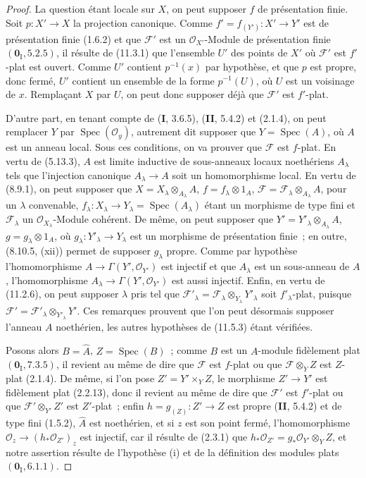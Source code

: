 \begin{proof}
La question étant locale sur $X$, on peut supposer $f$ de présentation finie.
Soit $p:X'\to X$ la projection canonique. Comme
$f'=f_{(Y')}:X'\to Y'$ est de présentation finie (1.6.2) et que $\mathcal F'$
est un $\mathcal O_{X'}$-Module de présentation finie
$(\mathbf 0_{\mathrm I},5.2.5)$, il résulte de (11.3.1) que l'ensemble $U'$ des
points de $X'$ où $\mathcal F'$ est $f'$-plat est ouvert. Comme $U'$ contient
$p^{-1}(x)$ par hypothèse, et que $p$ est propre, donc fermé, $U'$ contient un
ensemble de la forme $p^{-1}(U)$, où $U$ est un voisinage de $x$. Remplaçant $X$
par $U$, on peut donc supposer déjà que $\mathcal F'$ est $f'$-plat.

D'autre part, en tenant compte de (\textbf I, 3.6.5), (\textbf{II}, 5.4.2) et
(2.1.4), on peut remplacer $Y$ par $\operatorname{Spec}(\mathcal O_y)$,
autrement dit supposer que $Y=\operatorname{Spec}(A)$, où $A$ est un anneau
local. Sous ces conditions, on va prouver que $\mathcal F$ est $f$-plat. En
vertu de (5.13.3), $A$ est limite inductive de sous-anneaux locaux noethériens
$A_\lambda$ tels que l'injection canonique $A_\lambda\to A$ soit un
homomorphisme local. En vertu de (8.9.1), on peut supposer que
$X=X_\lambda\otimes_{A_\lambda}A$, $f=f_\lambda\otimes1_A$,
$\mathcal F=\mathcal F_\lambda\otimes_{A_\lambda}A$, pour un $\lambda$
convenable, $f_\lambda:X_\lambda\to Y_\lambda=\operatorname{Spec}(A_\lambda)$
étant un morphisme de type fini et $\mathcal F_\lambda$ un
$\mathcal O_{X_\lambda}$-Module cohérent. De même, on peut supposer que
$Y'=Y'_\lambda\otimes_{A_\lambda}A$, $g=g_\lambda\otimes1_A$, où
$g_\lambda:Y'_\lambda\to Y_\lambda$ est un morphisme de présentation finie~;
en outre, (8.10.5, (xii)) permet de supposer $g_\lambda$ propre. Comme par
hypothèse l'homomorphisme $A\to\Gamma(Y',\mathcal O_{Y'})$ est injectif et que
$A_\lambda$ est un sous-anneau de $A$, l'homomorphisme
$A_\lambda\to\Gamma(Y',\mathcal O_{Y'})$ est aussi injectif. Enfin, en vertu de
(11.2.6), on peut supposer $\lambda$ pris tel que
$\mathcal F'_\lambda=\mathcal F_\lambda\otimes_{Y_\lambda}Y'_\lambda$ soit
$f'_\lambda$-plat, puisque $\mathcal F'=\mathcal F'_\lambda\otimes_{Y'_\lambda}Y'$.
Ces remarques prouvent que l'on peut désormais supposer l'anneau $A$
noethérien, les autres hypothèses de (11.5.3) étant vérifiées.

Posons alors $B=\widehat A$, $Z=\operatorname{Spec}(B)$~; comme $B$ est un
$A$-module fidèlement plat $(\mathbf 0_{\mathrm I},7.3.5)$, il revient au même
de dire que $\mathcal F$ est $f$-plat ou que $\mathcal F\otimes_Y Z$ est
$Z$-plat (2.1.4). De même, si l'on pose $Z'=Y'\times_Y Z$, le morphisme
$Z'\to Y'$ est fidèlement plat (2.2.13), donc il revient au même de dire que
$\mathcal F'$ est $f'$-plat ou que $\mathcal F'\otimes_{Y'}Z'$ est $Z'$-plat~;
enfin $h=g_{(Z)}:Z'\to Z$ est propre (\textbf{II}, 5.4.2) et de type fini
(1.5.2), $\widehat A$ est noethérien, et si $z$ est son point fermé,
l'homomorphisme $\mathcal O_z\to(h_*\mathcal O_{Z'})_z$ est injectif, car il
résulte de (2.3.1) que $h_*\mathcal O_{Z'}=g_*\mathcal O_{Y'}\otimes_Y Z$,
et notre assertion résulte de l'hypothèse (i) et de la définition des modules
plats $(\mathbf 0_{\mathrm I},6.1.1)$.


\end{proof}
